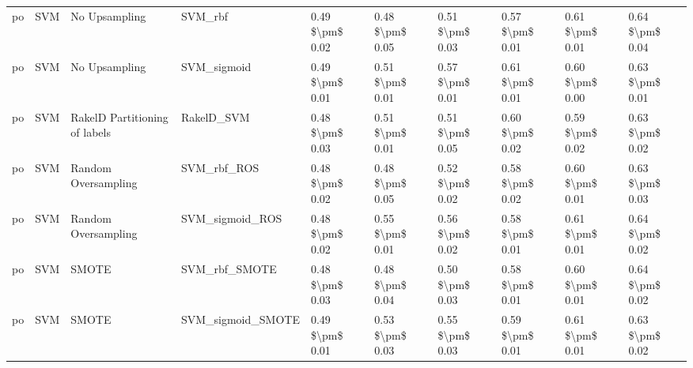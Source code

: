 \begin{tabular}{llllllllll}
      po &                             SVM &                 No Upsampling &                                      SVM\_rbf & 0.49 \$\textbackslash pm\$ 0.02 &           0.48 \$\textbackslash pm\$ 0.05 &       0.51 \$\textbackslash pm\$ 0.03 &        0.57 \$\textbackslash pm\$ 0.01 &                         0.61 \$\textbackslash pm\$ 0.01 &     0.64 \$\textbackslash pm\$ 0.04 \\
      po &                             SVM &                 No Upsampling &                                  SVM\_sigmoid & 0.49 \$\textbackslash pm\$ 0.01 &           0.51 \$\textbackslash pm\$ 0.01 &       0.57 \$\textbackslash pm\$ 0.01 &        0.61 \$\textbackslash pm\$ 0.01 &                         0.60 \$\textbackslash pm\$ 0.00 &     0.63 \$\textbackslash pm\$ 0.01 \\
      po &                             SVM & RakelD Partitioning of labels &                                   RakelD\_SVM & 0.48 \$\textbackslash pm\$ 0.03 &           0.51 \$\textbackslash pm\$ 0.01 &       0.51 \$\textbackslash pm\$ 0.05 &        0.60 \$\textbackslash pm\$ 0.02 &                         0.59 \$\textbackslash pm\$ 0.02 &     0.63 \$\textbackslash pm\$ 0.02 \\
      po &                             SVM &           Random Oversampling &                                  SVM\_rbf\_ROS & 0.48 \$\textbackslash pm\$ 0.02 &           0.48 \$\textbackslash pm\$ 0.05 &       0.52 \$\textbackslash pm\$ 0.02 &        0.58 \$\textbackslash pm\$ 0.02 &                         0.60 \$\textbackslash pm\$ 0.01 &     0.63 \$\textbackslash pm\$ 0.03 \\
      po &                             SVM &           Random Oversampling &                              SVM\_sigmoid\_ROS & 0.48 \$\textbackslash pm\$ 0.02 &           0.55 \$\textbackslash pm\$ 0.01 &       0.56 \$\textbackslash pm\$ 0.02 &        0.58 \$\textbackslash pm\$ 0.01 &                         0.61 \$\textbackslash pm\$ 0.01 &     0.64 \$\textbackslash pm\$ 0.02 \\
      po &                             SVM &                         SMOTE &                                SVM\_rbf\_SMOTE & 0.48 \$\textbackslash pm\$ 0.03 &           0.48 \$\textbackslash pm\$ 0.04 &       0.50 \$\textbackslash pm\$ 0.03 &        0.58 \$\textbackslash pm\$ 0.01 &                         0.60 \$\textbackslash pm\$ 0.01 &     0.64 \$\textbackslash pm\$ 0.02 \\
      po &                             SVM &                         SMOTE &                            SVM\_sigmoid\_SMOTE & 0.49 \$\textbackslash pm\$ 0.01 &           0.53 \$\textbackslash pm\$ 0.03 &       0.55 \$\textbackslash pm\$ 0.03 &        0.59 \$\textbackslash pm\$ 0.01 &                         0.61 \$\textbackslash pm\$ 0.01 &     0.63 \$\textbackslash pm\$ 0.02 \\

\end{tabular}
